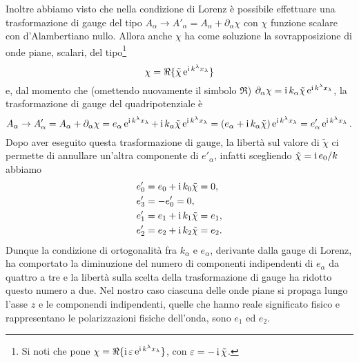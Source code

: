 Inoltre abbiamo visto che nella condizione di Lorenz è possibile effettuare una
trasformazione di gauge del tipo
$A_{\alpha} \to A'_{\alpha} = A_{\alpha} + \partial_{\alpha}\chi$ con $\chi$
funzione scalare con d'Alambertiano nullo.  Allora anche $\chi$ ha come
soluzione la sovrapposizione di onde piane, scalari, del
tipo\footnote{Si noti che \textcite[258]{weinberg:gravitation} pone
  $\chi = \Re \{\operatorname{\mathrm{i}} \varepsilon\operatorname{\mathrm{e}}^{\operatorname{\mathrm{i}} k^{\lambda}x_{\lambda}}\}$, con
  $\varepsilon = -\operatorname{\mathrm{i}} \tilde\chi$.}
\begin{equation}
  \chi = \Re \{\tilde{\chi} \operatorname{\mathrm{e}}^{\operatorname{\mathrm{i}} k^{\lambda}x_{\lambda}}\}
\end{equation}
e, dal momento che (omettendo nuovamente il simbolo $\Re$)
$\partial_{\alpha} \chi = \operatorname{\mathrm{i}} k_{\alpha}
\tilde{\chi}\operatorname{\mathrm{e}}^{\operatorname{\mathrm{i}} k^{\lambda}x_{\lambda}}$,
la trasformazione di gauge del quadripotenziale è
\begin{equation}
  A_{\alpha} \to A'_{\alpha} = A_{\alpha} + \partial_{\alpha}\chi = e_{\alpha}
  \operatorname{\mathrm{e}}^{\operatorname{\mathrm{i}} k^{\lambda}x_{\lambda}} + \operatorname{\mathrm{i}} k_{\alpha}  \tilde{\chi}\operatorname{\mathrm{e}}^{\operatorname{\mathrm{i}}
    k^{\lambda}x_{\lambda}} = (e_{\alpha} + \operatorname{\mathrm{i}} k_{\alpha} \tilde\chi)\operatorname{\mathrm{e}}^{\operatorname{\mathrm{i}}
    k^{\lambda}x_{\lambda}} = e'_{\alpha}\operatorname{\mathrm{e}}^{\operatorname{\mathrm{i}} k^{\lambda}x_{\lambda}}.
\end{equation}
Dopo aver eseguito questa trasformazione di gauge, la libertà sul valore di
$\tilde\chi$ ci permette di annullare un'altra componente di $e'_{\alpha}$,
infatti scegliendo $\tilde\chi = \operatorname{\mathrm{i}} e_{0}/k$ abbiamo
\begin{subequations}
  \begin{align}
    e'_{0} &= e_{0} + \operatorname{\mathrm{i}} k_{0} \tilde\chi = 0, \\
    e'_{3} &= -e'_{0} = 0, \\
    e'_{1} &= e_{1} + \operatorname{\mathrm{i}} k_{1} \tilde\chi = e_{1}, \\
    e'_{2} &= e_{2} + \operatorname{\mathrm{i}} k_{2} \tilde\chi = e_{2}.
  \end{align}
\end{subequations}
Dunque la condizione di ortogonalità fra $k_{\alpha}$ e $e_{\alpha}$, derivante
dalla gauge di Lorenz, ha comportato la diminuzione del numero di componenti
indipendenti di $e_{\alpha}$ da quattro a tre e la libertà sulla scelta della
trasformazione di gauge ha ridotto questo numero a due.  Nel nostro caso
ciascuna delle onde piane si propaga lungo l'asse $z$ e le componendi
indipendenti, quelle che hanno reale significato fisico e rappresentano le
polarizzazioni fisiche dell'onda, sono $e_{1}$ ed $e_{2}$.

